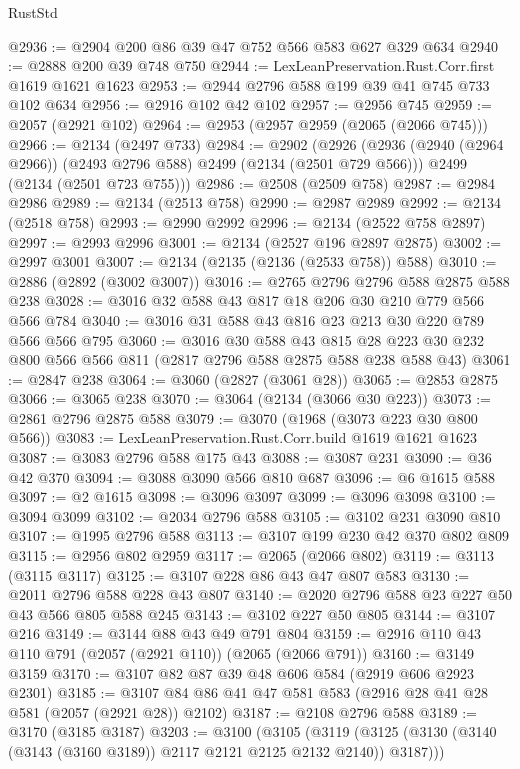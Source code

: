 \begin{lexlean}{RustStd}
\begin{coremodule}
@2936 := @2904 @200 @86 @39 @47 @752 @566 @583 @627 @329 @634
@2940 := @2888 @200 @39 @748 @750
@2944 := LexLeanPreservation.Rust.Corr.first @1619 @1621 @1623
@2953 := @2944 @2796 @588 @199 @39 @41 @745 @733 @102 @634
@2956 := @2916 @102 @42 @102
@2957 := @2956 @745
@2959 := @2057 (@2921 @102)
@2964 := @2953 (@2957 @2959 (@2065 (@2066 @745)))
@2966 := @2134 (@2497 @733)
@2984 := @2902
    (@2926
      (@2936 (@2940 (@2964 @2966)) (@2493 @2796 @588) @2499 (@2134 (@2501 @729 @566)))
      @2499
      (@2134 (@2501 @723 @755)))
@2986 := @2508 (@2509 @758)
@2987 := @2984 @2986
@2989 := @2134 (@2513 @758)
@2990 := @2987 @2989
@2992 := @2134 (@2518 @758)
@2993 := @2990 @2992
@2996 := @2134 (@2522 @758 @2897)
@2997 := @2993 @2996
@3001 := @2134 (@2527 @196 @2897 @2875)
@3002 := @2997 @3001
@3007 := @2134 (@2135 (@2136 (@2533 @758)) @588)
@3010 := @2886 (@2892 (@3002 @3007))
@3016 := @2765 @2796 @2796 @588 @2875 @588 @238
@3028 := @3016 @32 @588 @43 @817 @18 @206 @30 @210 @779 @566 @566 @784
@3040 := @3016 @31 @588 @43 @816 @23 @213 @30 @220 @789 @566 @566 @795
@3060 := @3016
    @30
    @588
    @43
    @815
    @28
    @223
    @30
    @232
    @800
    @566
    @566
    @811
    (@2817 @2796 @588 @2875 @588 @238 @588 @43)
@3061 := @2847 @238
@3064 := @3060 (@2827 (@3061 @28))
@3065 := @2853 @2875
@3066 := @3065 @238
@3070 := @3064 (@2134 (@3066 @30 @223))
@3073 := @2861 @2796 @2875 @588
@3079 := @3070 (@1968 (@3073 @223 @30 @800 @566))
@3083 := LexLeanPreservation.Rust.Corr.build @1619 @1621 @1623
@3087 := @3083 @2796 @588 @175 @43
@3088 := @3087 @231
@3090 := @36 @42 @370
@3094 := @3088 @3090 @566 @810 @687
@3096 := @6 @1615 @588
@3097 := @2 @1615
@3098 := @3096 @3097
@3099 := @3096 @3098
@3100 := @3094 @3099
@3102 := @2034 @2796 @588
@3105 := @3102 @231 @3090 @810
@3107 := @1995 @2796 @588
@3113 := @3107 @199 @230 @42 @370 @802 @809
@3115 := @2956 @802 @2959
@3117 := @2065 (@2066 @802)
@3119 := @3113 (@3115 @3117)
@3125 := @3107 @228 @86 @43 @47 @807 @583
@3130 := @2011 @2796 @588 @228 @43 @807
@3140 := @2020 @2796 @588 @23 @227 @50 @43 @566 @805 @588 @245
@3143 := @3102 @227 @50 @805
@3144 := @3107 @216
@3149 := @3144 @88 @43 @49 @791 @804
@3159 := @2916 @110 @43 @110 @791 (@2057 (@2921 @110)) (@2065 (@2066 @791))
@3160 := @3149 @3159
@3170 := @3107 @82 @87 @39 @48 @606 @584 (@2919 @606 @2923 @2301)
@3185 := @3107 @84 @86 @41 @47 @581 @583 (@2916 @28 @41 @28 @581 (@2057 (@2921 @28)) @2102)
@3187 := @2108 @2796 @588
@3189 := @3170 (@3185 @3187)
@3203 := @3100
    (@3105
      (@3119 (@3125 (@3130 (@3140 (@3143 (@3160 @3189)) @2117 @2121 @2125 @2132 @2140)) @3187)))

\end{coremodule}
\end{lexlean}
